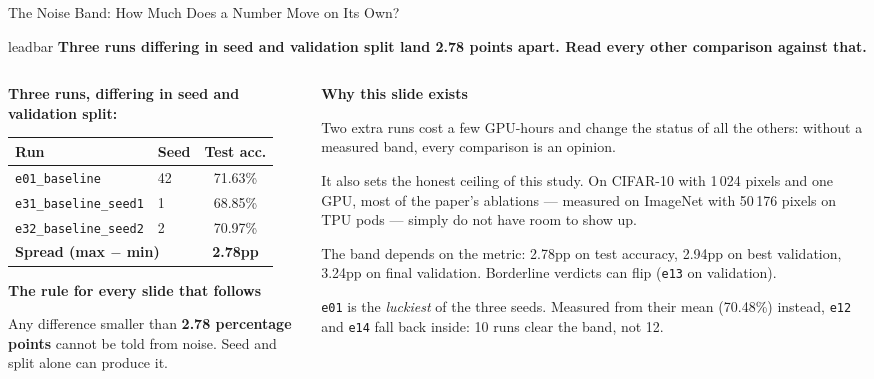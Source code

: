 \documentclass[aspectratio=169,11pt]{beamer}
\newcommand{\lead}[1]{%
  \begin{beamercolorbox}[wd=\textwidth,sep=5pt,center]{leadbar}%
    \small\bfseries #1%
  \end{beamercolorbox}\vspace{0.6em}}
\newcommand{\colhead}[1]{{\color{HeadBlue}\bfseries #1}\par\vspace{0.25em}}
\newcommand{\alerthead}[1]{{\color{AccentRed}\bfseries #1}\par\vspace{0.25em}}
\begin{document}
\begin{frame}[shrink=11]{The Noise Band: How Much Does a Number Move on Its Own?}
  \lead{Three runs differing in seed and validation split land 2.78 points apart. Read every other comparison against that.}
  \begin{columns}[T]
    \begin{column}{0.52\textwidth}
      \textbf{Three runs, differing in seed and validation split:}
      \begin{table}
        \centering\small
        \begin{tabular}{llc}
          \toprule
          \textbf{Run} & \textbf{Seed} & \textbf{Test acc.} \\
          \midrule
          \texttt{e01\_baseline} & 42 & 71.63\% \\
          \texttt{e31\_baseline\_seed1} & 1 & 68.85\% \\
          \texttt{e32\_baseline\_seed2} & 2 & 70.97\% \\
          \midrule
          \multicolumn{2}{l}{\textbf{Spread (max $-$ min)}} & \textbf{2.78pp} \\
          \bottomrule
        \end{tabular}
      \end{table}

      \vspace{0.3em}
      \alerthead{The rule for every slide that follows}
        \small
        Any difference smaller than \textbf{2.78 percentage points} cannot be told from noise. Seed and split alone can produce it.
      
    \end{column}
    \begin{column}{0.44\textwidth}
      \colhead{Why this slide exists}
        \small
        Two extra runs cost a few GPU-hours and change the status of all the others: without a measured band, every comparison is an opinion.

        \vspace{0.4em}
        It also sets the honest ceiling of this study. On CIFAR-10 with 1\,024 pixels and one GPU, most of the paper's ablations --- measured on ImageNet with 50\,176 pixels on TPU pods --- simply do not have room to show up.
      

      \vspace{0.3em}
      \scriptsize The band depends on the metric: 2.78pp on test accuracy, 2.94pp on best validation, 3.24pp on final validation. Borderline verdicts can flip (\texttt{e13} on validation).

      \vspace{0.2em}
      \texttt{e01} is the \emph{luckiest} of the three seeds. Measured from their mean (70.48\%) instead, \texttt{e12} and \texttt{e14} fall back inside: 10 runs clear the band, not 12.
    \end{column}
  \end{columns}
\end{frame}
\end{document}
